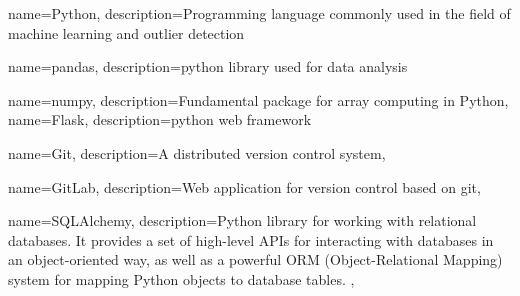 {
    name={Python},
    description={Programming language commonly used in the field of machine learning and outlier detection}
}

{
    name={pandas},
    description={\Gls*{python} library used for data analysis}
}

{
    name={numpy},
    description={Fundamental package for array computing in Python},
}
{
    name={Flask},
    description={\Gls*{python} web framework}
}

{
    name={Git},
    description={A distributed version control system},
}

{
    name={GitLab},
    description={Web application for version control based on \gls*{git}},
}

{
    name={SQLAlchemy},
    description={Python library for working with relational databases. It provides a set of high-level APIs for interacting with databases in an object-oriented way, as well as a powerful \Gls{ORM} (Object-Relational Mapping) system for mapping Python objects to database tables. },
}